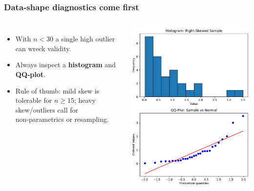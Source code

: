 \documentclass[handout]{beamer}
\begin{document}
\begin{frame}
\frametitle{Data‐shape diagnostics come first}
\vspace{-0.7em}
\begin{columns}
\begin{itemize}
  \item With \(n<30\) a single high outlier can wreck validity.  
  \item Always inspect a \textbf{histogram} and \textbf{QQ‑plot}.  
  \item Rule of thumb: mild skew is tolerable for \(n\ge 15\); heavy skew/outliers call for non‑parametrics or resampling.
\end{itemize}
\includegraphics[width=\textwidth]{Figures/qq_example.pdf}
\end{columns}
\end{frame}
\end{document}
